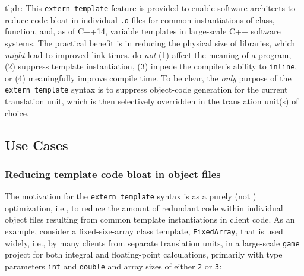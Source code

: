 \noindent tl;dr: This \lstinline!extern!~\lstinline!template! feature is provided to
enable software architects to reduce code bloat in individual
\lstinline!.o! files for common instantiations of class,
function, and, as of C++14, variable templates in
large-scale C++ software systems. The practical benefit is in reducing
the physical size of libraries, which \emph{might} lead to improved link
times.  do \emph{not}
(1) affect the meaning of a program, (2) suppress template
instantiation, (3) impede the compiler's ability to \lstinline!inline!, or
(4) meaningfully improve compile time. To be clear, the \emph{only}
purpose of the \lstinline!extern!~\lstinline!template! syntax is to suppress
object-code generation for the current translation unit, which is then
selectively overridden in the translation unit(s) of choice.

\subsection[Use Cases]{Use Cases}\label{use-cases}

\subsubsection[Reducing template code bloat in object files]{Reducing template code bloat in object files}\label{reducing-template-code-bloat-in-object-files}

The motivation for the \lstinline!extern!~\lstinline!template! syntax is as a
purely  (not ) optimization, i.e., to
reduce the amount of redundant code within individual object files
resulting from common template instantiations in client code. As an
example, consider a fixed-size-array class template,
\lstinline!FixedArray!, that is used widely, i.e., by many clients from
separate translation units, in a large-scale \lstinline!game! project for
both integral and floating-point calculations, primarily with type
parameters \lstinline!int! and \lstinline!double! and array sizes of either
\lstinline!2! or \lstinline!3!:

